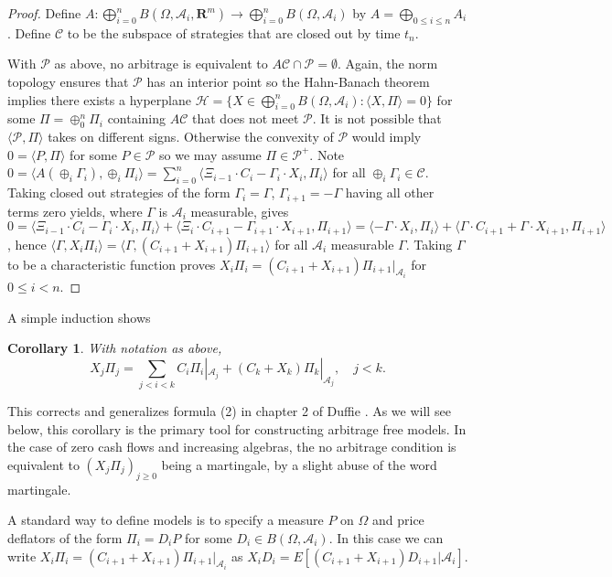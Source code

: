 \documentclass[fleqn]{amsart}
\newcommand{\R}{\mathbf{R}}
\renewcommand{\AA}{\mathcal{A}}
\newcommand{\CC}{\mathcal{C}}
\newcommand{\HH}{\mathcal{H}}
\newcommand{\PP}{\mathcal{P}}
\providecommand{\pair}[1]{\langle#1\rangle}
\newtheorem{corollary}[theorem]{Corollary}
\begin{document}
\begin{proof}
Define \(A\colon\bigoplus_{i=0}^{n}B(\Omega, \AA_i, \R^m) 
\to \bigoplus_{i=0}^{n}B(\Omega, \AA_i)\) by
\(A = \bigoplus_{0\le i \le n} A_i\). Define \(\CC\) to
be the subspace of strategies that are closed out
by time \(t_n\).

With \(\PP\) as above, no arbitrage is equivalent to
\(A\CC\cap\PP=\emptyset\). Again, the norm topology ensures that $\PP$
has an interior point so the Hahn-Banach theorem implies there exists
a hyperplane $\HH = \{X\in\bigoplus_{i=0}^{n}B(\Omega, \AA_i): \pair{X,\Pi} = 0\}$ for some $\Pi = \oplus_0^n\Pi_i$
containing $A\CC$ that does not meet $\PP$. It is not possible that
$\langle\PP,\Pi\rangle$ takes on different signs. Otherwise the convexity
of $\PP$ would imply $0 = \langle P,\Pi\rangle$ for some $P\in\PP$
so we may assume $\Pi\in\PP^+$. Note
$0 = \pair{A(\oplus_i\Gamma_i),\oplus_i\Pi_i}
= \sum_{i=0}^n\pair{\Xi_{i - 1}\cdot C_i - \Gamma_i\cdot X_i,\Pi_i}$
for all $\oplus_i\Gamma_i\in\CC$. 
Taking closed out strategies of the
form $\Gamma_i = \Gamma$, $\Gamma_{i+1} = -\Gamma$ having all other
terms zero yields, where $\Gamma$ is $\AA_i$ measurable,
gives $0 = \pair{\Xi_{i - 1}\cdot C_i - \Gamma_i\cdot X_i,\Pi_i}
+ \pair{\Xi_{i}\cdot C_{i+1} - \Gamma_{i+1}\cdot X_{i+1},\Pi_{i+1}}
= \pair{- \Gamma\cdot X_i,\Pi_i}
+ \pair{\Gamma\cdot C_{i+1} + \Gamma\cdot X_{i+1},\Pi_{i+1}}
$,
hence $\pair{\Gamma, X_i \Pi_i} = \pair{\Gamma, (C_{i+1} + X_{i+1})\Pi_{i+1}}$
for all $\AA_i$ measurable $\Gamma$.
Taking \(\Gamma\) to be a characteristic function proves
\(X_i\Pi_i = (C_{i+1} + X_{i+1})\Pi_{i+1}|_{\AA_i}\) for \(0\le i < n\).
\end{proof}

A simple induction shows
\begin{corollary}
With notation as above,
\begin{equation}
X_j \Pi_j
  = \sum_{j < i < k} C_i\Pi_i|_{\AA_j} + (C_k + X_k)\Pi_k|_{\AA_j},\quad j < k.
\end{equation}
\end{corollary}

This corrects and generalizes formula (2) in chapter 2 of Duffie \cite{Duf1996}.
As we will see below, this corollary is the primary tool for constructing
arbitrage free models. In the case of zero cash flows and increasing algebras, 
the no arbitrage condition is equivalent to $(X_j\Pi_j)_{j\ge0}$
being a martingale, by a slight abuse of the word martingale.

A standard way to define models is to specify a measure \(P\) on
\(\Omega\) and price deflators of the form \(\Pi_i = D_iP\) for
some \(D_i\in B(\Omega,\AA_i)\). In this case we can write
\(X_i \Pi_i = (C_{i+1} + X_{i+1})\Pi_{i+1}|_{\AA_i}\)
as \(X_i D_i = E[(C_{i+1} + X_{i+1})D_{i+1}|\AA_i]\).
\end{document}
